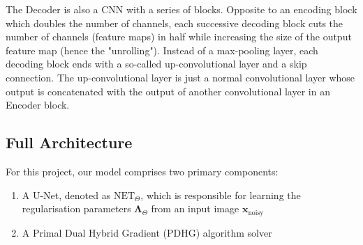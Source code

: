 \documentclass[12pt]{article}
\begin{document}
The Decoder is also a CNN with a series of blocks. Opposite to an encoding block which doubles the number of channels, each successive decoding block cuts the number of channels (feature maps) in half while increasing the size of the output feature map (hence the "unrolling").
Instead of a max-pooling layer, each decoding block ends with a so-called up-convolutional layer and a skip connection. 
The up-convolutional layer is just a normal convolutional layer whose output is concatenated with the output of another convolutional layer in an Encoder block. 







\subsection{Full Architecture}




For this project, our model comprises two primary components:
\begin{enumerate}
    \item A U-Net, denoted as $\text{NET}_{\Theta}$, which is responsible for learning the regularisation parameters $\mathbf{\Lambda}_{\Theta}$ from an input image 
    $\mathbf{x}_{\text{noisy}}$
    \item A Primal Dual Hybrid Gradient (PDHG) algorithm solver 
\end{enumerate}
\end{document}
